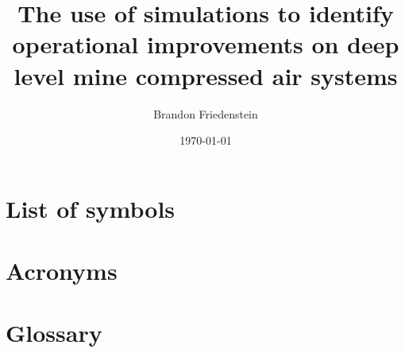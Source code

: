 \documentclass[12pt, english, oneside, singlespacing, open=any]{report}
\begin{document}
	
\begin{titlepage}
	\title{The use of simulations to identify
		operational improvements on deep level mine compressed
		air systems}
	\date{\today}
	\author{Brandon Friedenstein}
	\maketitle
\end{titlepage}

\begin{abstract}
	\thispagestyle{plain}
	\setcounter{page}{2}
\end{abstract}

\setcounter{page}{3}
\tableofcontents



\chapter*{List of symbols}

\chapter*{Acronyms}

\chapter*{Glossary}









\end{document}
